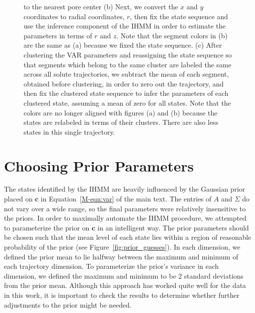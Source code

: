 \documentclass{article}
\begin{document}
\begin{figure}
{	to the nearest pore center (b) Next, we convert the $x$ and $y$ 	
	coordinates to radial coordinates, $r$, then fix the state sequence and use the inference 
	component of the IHMM in order to estimate the parameters in terms of $r$ and $z$. Note that
	the segment colors in (b) are the same as (a) because we fixed the state sequence.
	(c) After clustering the VAR parameters and reassigning the state sequence so that segments 
	which belong to the same cluster are labeled the same across all solute trajectories, we subtract
	the mean of each segment, obtained before clustering, in order to zero out the
  	trajectory, and then fix the clustered state sequence to infer the parameters of each clustered 
  	state, assuming a mean of zero for all states. Note that the colors are no longer aligned with 
  	figures (a) and (b) because the states are relabeled in terms of their clusters. There are
  	also less states in this single trajectory.
	}\label{fig:hmm_demo}
  \end{figure}
  
  \newpage
  
  \section{Choosing Prior Parameters}\label{section:prior_guesses}  
  
  The states identified by the IHMM are heavily influenced by the Gaussian prior
  placed on $\mathbf{c}$ in Equation~\ref{M-eqn:var} of the main text. The 
  entries of $A$ and $\Sigma$ do not vary over a wide range, so the final
  parameters were relatively insensitive to the priors. In order to 
  maximally automate the IHMM procedure, we attempted to parameterize the
  prior on $\mathbf{c}$ in an intelligent way. The prior parameters should
  be chosen such that the mean level of each state lies within a region of 
  reasonable probability of the prior (see Figure~\ref{fig:prior_guesses}).
  In each dimension, we defined the prior mean to lie halfway between the 
  maximum and minimum of each trajectory dimension. To parameterize the 
  prior's variance in each dimension, we defined the maximum and minimum to 
  be 2 standard deviations from the prior mean. Although this approach has 
  worked quite well for the data in this work, it is important to check the 
  results to determine whether further adjustments to the prior might be needed.
  
\end{document}
